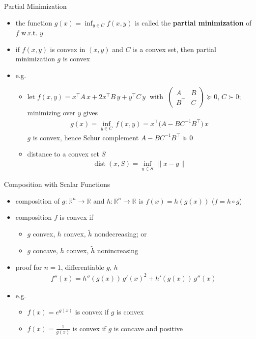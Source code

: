 \documentclass[10pt,handout]{beamer}
\newcommand{\ds}{\displaystyle}
\DeclareMathOperator*{\dist}{dist}
\theoremstyle{definition}
\begin{document}
\begin{frame}{Partial Minimization}
  \begin{itemize}
    \item the function $\ds g(x) = \inf_{y\in C} f(x, y)$ is called the {\bf partial minimization} of $f$ w.r.t. $y$
    \item if $f(x, y)$ is convex in $(x, y)$ and $C$ is a convex set, then partial minimization $g$ is convex
    \item e.g.
      \begin{itemize}
        \item let $f(x, y) = x^\top A\,x + 2 x^\top B\,y + y^\top C\,y\;$ with $\ds\;\begin{pmatrix}A & B \\ B^\top & C\end{pmatrix}\succcurlyeq 0$, $C\succ 0$; minimizing over $y$ gives 
          \begin{align*}
            g(x) = \inf_{y\in C}\,f(x, y) = x^\top\big(A - BC^{-1}B^\top\big)\,x
          \end{align*}
          $g$ is convex, hence Schur complement $A - BC^{-1}B^\top\succcurlyeq 0$
        \item distance to a convex set $S$
          \begin{align*}
            \dist(x, S) = \inf_{y\in S}\,\|x - y\|
          \end{align*}
      \end{itemize}
  \end{itemize}
\end{frame}

\begin{frame}{Composition with Scalar Functions}
  \begin{itemize}
    \item composition of $g:\mathbb{R}^n\to\mathbb{R}$ and $h:\mathbb{R}^n\to\mathbb{R}$ is $\ds f(x) = h(g(x))$ ($\ds f = h\circ g$)
    \item composition $f$ is convex if
      \begin{itemize}
        \item $g$ convex, $h$ convex, $\ds\widetilde{h}$ nondecreasing; or
        \item $g$ concave, $h$ convex, $\ds\widetilde{h}$ nonincreasing
      \end{itemize}
    \item proof for $n = 1$, differentiable $g$, $h$
      \begin{align*}
        f''(x) = h''(g(x))\,g'(x)^2 + h'(g(x))\,g''(x)
      \end{align*}
    \item e.g.
      \begin{itemize}
        \item $f(x) = e^{g(x)}$ is convex if $g$ is convex
        \item $\ds f(x) = \frac{1}{g(x)}$ is convex if $g$ is concave and positive
      \end{itemize}
  \end{itemize}
\end{frame}
\end{document}
